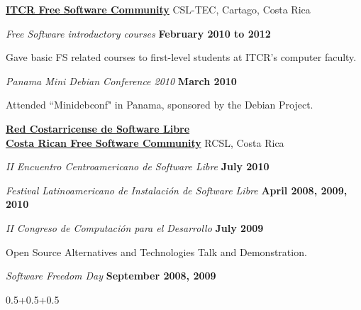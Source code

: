 \documentclass[10pt]{article}
\newlength{\footpageshift}
\newenvironment{outerlist}[1][\enskip\textbullet]%
        {\begin{itemize}[#1]}{\end{itemize}%
         \vspace{-0.9\baselineskip}}
\newenvironment{innerlist}[1][\enskip\textbullet]%
        {\begin{compactitem}[#1]}{\end{compactitem}}
\begin{document}
\href{http://csl-tec.softwarelibrecr.org/}{\textbf{ITCR Free Software Community}} CSL-TEC, Cartago, Costa Rica
\begin{outerlist}
	\item[] \textit{Free Software introductory courses}
		\hfill \textbf{February 2010 to 2012}
			\begin{innerlist}
			\item Gave basic FS related courses to first-level students at ITCR's computer faculty.
			\end{innerlist}
	\item[] \textit{Panama Mini Debian Conference 2010}
		\hfill \textbf{March 2010}
			\begin{innerlist}
			\item Attended ``Minidebconf" in Panama, sponsored by the Debian Project.\\
			\end{innerlist}

\end{outerlist}

\href{http://www.softwarelibrecr.org/}{\textbf{Red Costarricense de Software Libre}}\\
\href{http://www.softwarelibrecr.org/}{\textbf{Costa Rican Free Software Community}} RCSL, Costa Rica
\begin{outerlist}
	
	\item[] \textit{II Encuentro Centroamericano de Software Libre}
		\hfill \textbf{July 2010}


	\item[] \textit{Festival Latinoamericano de Instalaci\'{o}n de Software Libre}
		\hfill \textbf{April 2008, 2009, 2010}
			
	\item[] \textit{II Congreso de Computaci\'{o}n para el Desarrollo}
		\hfill \textbf{July 2009}
			\begin{innerlist}
			\item Open Source Alternatives and Technologies Talk and Demonstration.
			\end{innerlist}

	\item[] \textit{Software Freedom Day}
		\hfill \textbf{September 2008, 2009}

\end{outerlist}

\setlength{\footpageshift}
          {0.5\textwidth+0.5\marginparsep+0.5\marginparwidth-2in}
\end{document}
